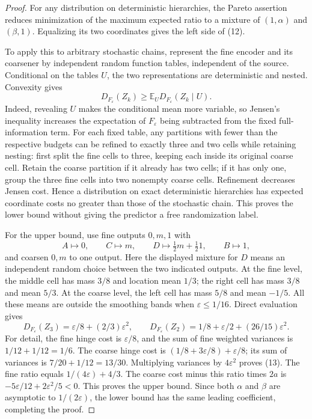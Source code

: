 \begin{proof}
For any distribution on deterministic hierarchies, the Pareto assertion
reduces minimization of the maximum expected ratio to a mixture of
$(1,\alpha)$ and $(\beta,1)$.  Equalizing its two coordinates gives
the left side of (12).

To apply this to arbitrary stochastic chains, represent the fine
encoder and its coarsener by independent random function tables,
independent of the source.  Conditional on the tables $U$, the two
representations are deterministic and nested.  Convexity gives
\[
 D_{F_\varepsilon}(Z_k)
 \geq\mathbb E_U D_{F_\varepsilon}(Z_k\mid U).
\]
Indeed, revealing $U$ makes the conditional mean more variable, so
Jensen's inequality increases the expectation of $F_\varepsilon$ being
subtracted from the fixed full-information term.  For each fixed table,
any partitions with fewer than the respective budgets can be refined
to exactly three and two cells while retaining nesting: first split the
fine cells to three, keeping each inside its original coarse cell.
Retain the coarse partition if it already has two cells; if it has only
one, group the three fine cells into two nonempty coarse cells.
Refinement decreases Jensen cost.  Hence a distribution
on exact deterministic hierarchies has expected coordinate costs no
greater than those of the stochastic chain.  This proves the lower
bound without giving the predictor a free randomization label.

For the upper bound, use fine outputs $0,m,1$ with
\[
 A\mapsto0,\qquad C\mapsto m,\qquad
 D\mapsto\tfrac12 m+\tfrac12 1,\qquad B\mapsto1,
\]
and coarsen $0,m$ to one output.  Here the displayed mixture for $D$
means an independent random choice between the two indicated outputs.
At the fine level, the middle cell has mass $3/8$ and location mean
$1/3$; the right cell has mass $3/8$ and mean $5/3$.
At the coarse level, the left cell has mass $5/8$ and mean $-1/5$.
All these means are outside the smoothing bands when
$\varepsilon\leq1/16$.  Direct evaluation gives
\[
 D_{F_\varepsilon}(Z_3)
   =\varepsilon/8+(2/3)\varepsilon^2,\qquad
 D_{F_\varepsilon}(Z_2)
   =1/8+\varepsilon/2+(26/15)\varepsilon^2.
 \tag{13}\label{eq:gadget-stochastic-costs}
\]
For detail, the fine hinge cost is $\varepsilon/8$, and the sum of
fine weighted variances is $1/12+1/12=1/6$.
The coarse hinge cost is
$(1/8+3\varepsilon/8)+\varepsilon/8$; its sum of variances is
$7/20+1/12=13/30$.  Multiplying variances by $4\varepsilon^2$
proves (13).  The fine ratio equals $1/(4\varepsilon)+4/3$.
The coarse cost minus this ratio times $2a$ is
$-5\varepsilon/12+2\varepsilon^2/5<0$.
This proves the upper bound.  Since both $\alpha$ and $\beta$ are
asymptotic to $1/(2\varepsilon)$, the lower bound has the same
leading coefficient, completing the proof.
\end{proof}

